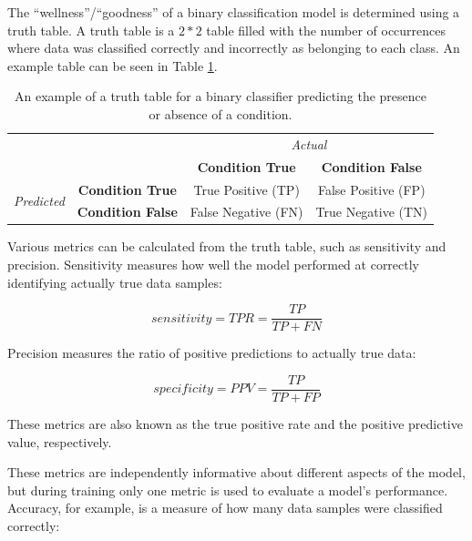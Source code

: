 The ``wellness''/``goodness'' of a binary classification model is determined using a truth table. A truth table is a $2*2$ table filled with the number of occurrences where data was classified correctly and incorrectly as belonging to each class. An example table can be seen in Table \ref{ch4:tab:truthtable}.

\begin{table}[]
\caption{An example of a truth table for a binary classifier predicting the presence or absence of a condition.}
\label{ch4:tab:truthtable}
\begin{tabular}{cc|c|c|}
\cline{3-4}
\multicolumn{2}{c}{\multirow{2}{*}{}}                                                & \multicolumn{2}{|c|}{\textit{Actual}}               \\ \cline{3-4} 
\multicolumn{2}{c|}{}                                                                 & \textbf{Condition True} & \textbf{Condition False} \\ \hline
\multicolumn{1}{|c|}{\multirow{2}{*}{\textit{Predicted}}} & \textbf{Condition True}  & True Positive (TP)      & False Positive (FP)      \\ \cline{2-4} 
\multicolumn{1}{|c|}{}                                    & \textbf{Condition False} & False Negative (FN)     & True Negative (TN)       \\ \hline
\end{tabular}
\end{table}

Various metrics can be calculated from the truth table, such as sensitivity and precision. Sensitivity measures how well the model performed at correctly identifying actually true data samples:

\begin{equation}
sensitivity = TPR = \frac{TP}{TP+FN}
\end{equation}

\noindent Precision measures the ratio of positive predictions to actually true data:

\begin{equation}
specificity = PPV = \frac{TP}{TP+FP}
\end{equation}

These metrics are also known as the true positive rate and the positive predictive value, respectively.

These metrics are independently informative about different aspects of the model, but during training only one metric is used to evaluate a model's performance. Accuracy, for example, is a measure of how many data samples were classified correctly:

